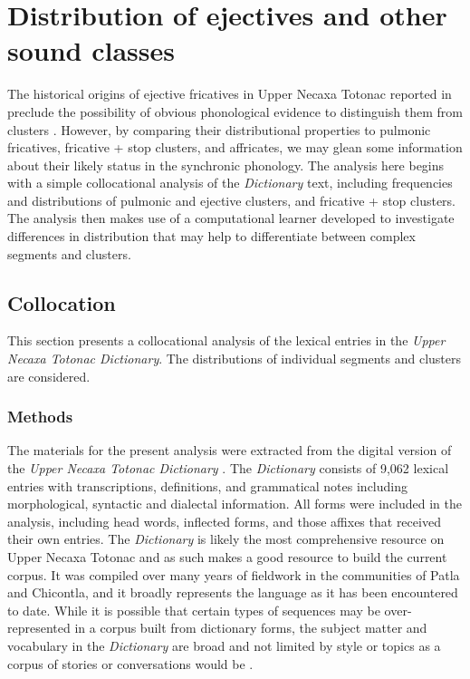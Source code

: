 \documentclass[output=paper,colorlinks,citecolor=brown]{langscibook}
\begin{document}
\section{Distribution of ejectives and other sound classes}\label{section:segDist}
The historical origins of ejective fricatives in Upper Necaxa Totonac reported in  preclude the possibility of obvious phonological evidence to distinguish them from clusters \citep{Beck2006}. However, by comparing their distributional properties to pulmonic fricatives, fricative + stop clusters, and affricates, we may glean some information about their likely status in the synchronic phonology. The analysis here begins with a simple collocational analysis of the \textit{Dictionary} text, including frequencies and distributions of pulmonic and ejective clusters, and fricative + stop clusters. The analysis then makes use of a computational learner developed to investigate differences in distribution that may help to differentiate between complex segments and clusters.

\subsection{Collocation}\label{section:collocation}
This section presents a collocational analysis of the lexical entries in the \textit{Upper Necaxa Totonac Dictionary}. The distributions of individual segments and clusters are considered.

\subsubsection{Methods}\label{subsubsection:collocationMethods}
The materials for the present analysis were extracted from the digital version of the \textit{Upper Necaxa Totonac Dictionary} \citep{Beck2011}. The \textit{Dictionary} consists of 9,062 lexical entries with transcriptions, definitions, and grammatical notes including morphological, syntactic and dialectal information. All forms were included in the analysis, including head words, inflected forms, and those affixes that received their own entries. The \textit{Dictionary} is likely the most comprehensive resource on Upper Necaxa Totonac and as such makes a good resource to build the current corpus. It was compiled over many years of fieldwork in the communities of Patla and Chicontla, and it broadly represents the language as it has been encountered to date. While it is possible that certain types of sequences may be over-represented in a corpus built from dictionary forms, the subject matter and vocabulary in the \textit{Dictionary} are broad and not limited by style or topics as a corpus of stories or conversations would be \citep{Bauer2015}.
\end{document}
